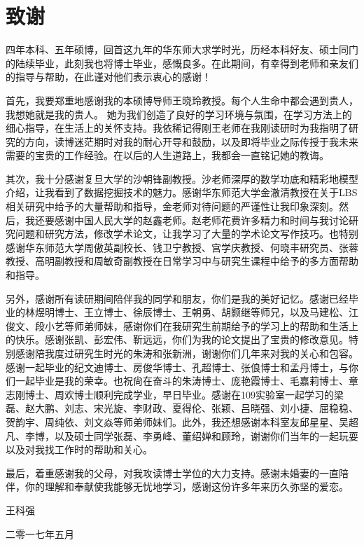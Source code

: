 {\kaishu
\chapter*{致\qquad 谢}
\begin{spacing}{1.5}

四年本科、五年硕博，回首这九年的华东师大求学时光，历经本科好友、硕士同门的陆续毕业，此刻我也将博士毕业，感慨良多。在此期间，有幸得到老师和亲友们的指导与帮助，在此谨对他们表示衷心的感谢！
	
首先，我要郑重地感谢我的本硕博导师王晓玲教授。每个人生命中都会遇到贵人，我想她就是我的贵人。
她为我们创造了良好的学习环境与氛围，在学习方法上的细心指导，在生活上的关怀支持。我依稀记得刚王老师在我刚读研时为我指明了研究的方向，读博迷茫期时对我的耐心开导和鼓励，以及即将毕业之际传授于我未来需要的宝贵的工作经验。在以后的人生道路上，我都会一直铭记她的教诲。

其次，我十分感谢复旦大学的沙朝锋副教授。沙老师深厚的数学功底和精彩地模型介绍，让我看到了数据挖掘技术的魅力。感谢华东师范大学金澈清教授在关于LBS相关研究中给予的大量帮助和指导，金老师对待问题的严谨性让我印象深刻。然后，我还要感谢中国人民大学的赵鑫老师。赵老师花费许多精力和时间与我讨论研究问题和研究方法，修改学术论文，让我学习了大量的学术论文写作技巧。也特别感谢华东师范大学周傲英副校长、钱卫宁教授、宫学庆教授、何晓丰研究员、张蓉教授、高明副教授和周敏奇副教授在日常学习中与研究生课程中给予的多方面帮助和指导。

另外，感谢所有读研期间陪伴我的同学和朋友，你们是我的美好记忆。感谢已经毕业的林煜明博士、王立博士、徐辰博士、王朝勇、胡颢继等师兄，以及马建松、江俊文、段小艺等师弟师妹，感谢你们在我研究生前期给予的学习上的帮助和生活上的快乐。感谢张凯、彭宏伟、靳远远，你们为我的论文提出了宝贵的修改意见。特别感谢陪我度过研究生时光的朱涛和张新洲，谢谢你们几年来对我的关心和包容。感谢一起毕业的纪文迪博士、房俊华博士、孔超博士、张俍博士和孟丹博士，与你们一起毕业是我的荣幸。也祝尙在奋斗的朱涛博士、庞艳霞博士、毛嘉莉博士、章志刚博士、周欢博士顺利完成学业，早日毕业。感谢在109实验室一起学习的梁磊、赵大鹏、刘志、宋光旋、李财政、夏得伦、张颖、吕晓强、刘小捷、屈稳稳、贺韵宇、周纯依、刘文焱等师弟师妹们。此外，我还想感谢本科室友邱星星、吴超凡、李博，以及硕士同学张磊、李勇峰、董绍婵和顾玲，谢谢你们当年的一起玩耍以及对我找工作时的帮助和关心。

最后，着重感谢我的父母，对我攻读博士学位的大力支持。感谢未婚妻的一直陪伴，你的理解和奉献使我能够无忧地学习，感谢这份许多年来历久弥坚的爱恋。

\end{spacing}
\vspace{0cm} \hspace{10.8cm}  王科强

\hspace{9.8cm}  二零一七年五月 }
